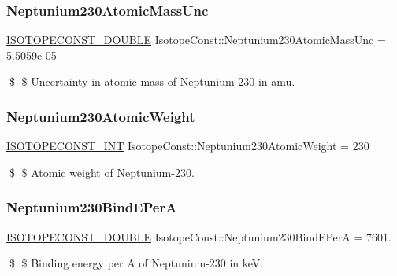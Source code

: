 \subsubsection{\texorpdfstring{Neptunium230\+Atomic\+Mass\+Unc}{Neptunium230AtomicMassUnc}}
{\footnotesize\ttfamily \mbox{\hyperlink{group___isotope_const-_macros_ga8f45a7272ce02c0b4c65c44636ed719a}{I\+S\+O\+T\+O\+P\+E\+C\+O\+N\+S\+T\+\_\+\+D\+O\+U\+B\+LE}} Isotope\+Const\+::\+Neptunium230\+Atomic\+Mass\+Unc = 5.\+5059e-\/05}

\$ \$ Uncertainty in atomic mass of Neptunium-\/230 in amu. \mbox{\label{group___isotope_const-_neptunium-_np230_gac6b5038ac73580bef6952ef13cfed27a}} 
\subsubsection{\texorpdfstring{Neptunium230\+Atomic\+Weight}{Neptunium230AtomicWeight}}
{\footnotesize\ttfamily \mbox{\hyperlink{group___isotope_const-_macros_ga5f18360b3e99483a35c32d789e62621c}{I\+S\+O\+T\+O\+P\+E\+C\+O\+N\+S\+T\+\_\+\+I\+NT}} Isotope\+Const\+::\+Neptunium230\+Atomic\+Weight = 230}

\$ \$ Atomic weight of Neptunium-\/230. \mbox{\label{group___isotope_const-_neptunium-_np230_ga2953bacff2e1e6fa4b500c5e50b0ca50}} 
\subsubsection{\texorpdfstring{Neptunium230\+Bind\+E\+PerA}{Neptunium230BindEPerA}}
{\footnotesize\ttfamily \mbox{\hyperlink{group___isotope_const-_macros_ga8f45a7272ce02c0b4c65c44636ed719a}{I\+S\+O\+T\+O\+P\+E\+C\+O\+N\+S\+T\+\_\+\+D\+O\+U\+B\+LE}} Isotope\+Const\+::\+Neptunium230\+Bind\+E\+PerA = 7601.}

\$ \$ Binding energy per A of Neptunium-\/230 in keV. \mbox{\label{group___isotope_const-_neptunium-_np230_ga0dc39eacb6a648bc885623933045957a}} 
